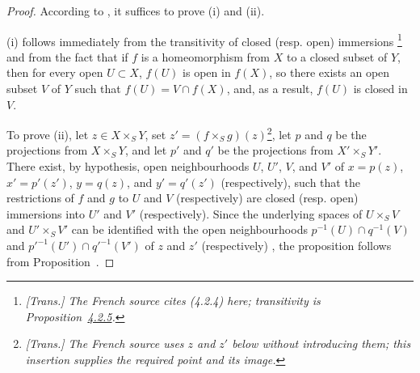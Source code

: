 \begin{proof}
According to , it suffices to prove (i) and (ii).

(i) follows immediately from the transitivity of closed (resp. open) immersions \footnote{\emph{[Trans.] The French source cites (4.2.4) here; transitivity is Proposition~\hyperref[I.4.2.5]{4.2.5}.}} and from the fact that if $f$ is a homeomorphism from $X$ to a closed subset of $Y$, then for every open $U\subset X$, $f(U)$ is open in $f(X)$, so there exists an open subset $V$ of $Y$ such that $f(U)=V\cap f(X)$, and, as a result, $f(U)$ is closed in $V$.

To prove (ii), let $z\in X\times_S Y$, set $z'=(f\times_S g)(z)$\footnote{\emph{[Trans.] The French source uses $z$ and $z'$ below without introducing them; this insertion supplies the required point and its image.}}, let $p$ and $q$ be the projections from $X\times_S Y$, and let $p'$ and $q'$ be the projections from $X'\times_S Y'$.
There exist, by hypothesis, open neighbourhoods $U$, $U'$, $V$, and $V'$ of $x=p(z)$, $x'=p'(z')$, $y=q(z)$, and $y'=q'(z')$ (respectively), such that the restrictions of $f$ and $g$ to $U$ and $V$ (respectively) are closed (resp. open) immersions into $U'$ and $V'$ (respectively).
Since the underlying spaces of $U\times_S V$ and $U'\times_S V'$ can be identified with the open neighbourhoods $p^{-1}(U)\cap q^{-1}(V)$ and ${p'}^{-1}(U')\cap{q'}^{-1}(V')$ of $z$ and $z'$ (respectively) , the proposition follows from Proposition~.
\end{proof}
